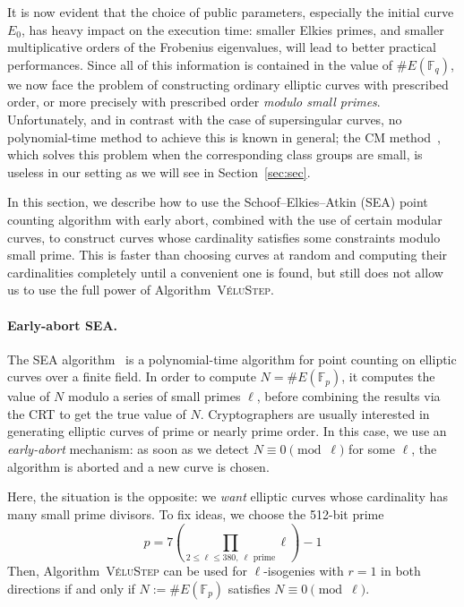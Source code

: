 \documentclass{llncs}
\newcommand{\F}{\mathbb{F}}
\newcommand{\algstyle}[1]{\textsc{#1}}
\begin{document}
It is now evident that the choice of public parameters, especially
the initial curve $E_0$, has heavy impact on the execution time:
smaller Elkies primes,
and smaller multiplicative orders of the Frobenius eigenvalues, will
lead to better practical performances. Since all of this information
is contained in the value of $\# E(\F_q)$, we now face the problem
of constructing ordinary elliptic curves with prescribed
order, or more precisely with prescribed order \emph{modulo small
primes}. Unfortunately, and in contrast with the case of
supersingular curves, no polynomial-time method to achieve this 
is known in general; the CM method~\cite{AtkinMorain93,Sutherland2012},
which solves this problem
when the corresponding class groups are small, is useless in our
setting as we will see in Section~\ref{sec:sec}.

In this section, we describe how to use the Schoof--Elkies--Atkin (SEA) point counting
algorithm with early abort, combined with the use of certain modular curves,
to construct curves whose cardinality satisfies some constraints
modulo small prime.
This is faster than choosing curves at random and computing their cardinalities
completely until a convenient one is found, but still does not allow us
to use the full power of Algorithm~\algstyle{VéluStep}.

\paragraph{Early-abort SEA.}
The SEA algorithm~\cite{schoof95,Morain95}
is a polynomial-time algorithm for
point counting on elliptic curves over a finite field. In order to compute
$N = \# E(\F_p)$, it computes the value of $N$ modulo a series
of small primes $\ell$, before combining the results via the CRT
to get the true value of $N$.
Cryptographers are usually interested in generating elliptic curves of
prime or nearly prime order. In this case, we use an \emph{early-abort}
mechanism: as soon as we detect $N \equiv 0\pmod{\ell}$ for some $\ell$, the algorithm is aborted
and a new curve is chosen.

Here, the situation is the opposite: we \emph{want} elliptic curves
whose cardinality has many small prime divisors.
To fix ideas, we choose the 512-bit prime
\[
    p = 7 \left(\prod_{2\leq\ell\leq 380,\ \ell \text{ prime}} \ell\right) - 1
\]
Then, Algorithm~\algstyle{VéluStep} can be used
for $\ell$-isogenies with $r=1$ in both directions if and only if
$N := \# E(\F_p)$ satisfies $N \equiv0\pmod{\ell}$.
\end{document}

